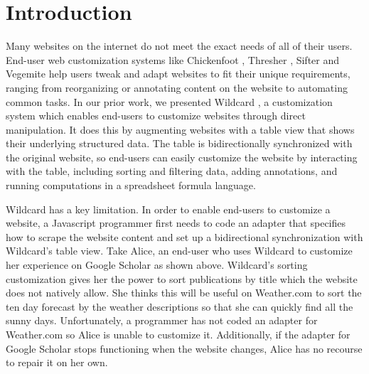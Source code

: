 \documentclass[sigconf,10pt]{acmart}
\begin{document}


\maketitle

\hypertarget{sec:introduction}{%
\section{Introduction}\label{sec:introduction}}

Many websites on the internet do not meet the exact needs of all of
their users. End-user web customization systems like Chickenfoot
\citep{bolin2005}, Thresher \citep{hogue2005}, Sifter \citep{huynh2006}
and Vegemite \citep{lin2009} help users tweak and adapt websites to fit
their unique requirements, ranging from reorganizing or annotating
content on the website to automating common tasks. In our prior work, we
presented Wildcard \citep{litt2020a}, a customization system which
enables end-users to customize websites through direct manipulation. It
does this by augmenting websites with a table view that shows their
underlying structured data. The table is bidirectionally synchronized
with the original website, so end-users can easily customize the website
by interacting with the table, including sorting and filtering data,
adding annotations, and running computations in a spreadsheet formula
language.

Wildcard has a key limitation. In order to enable end-users to customize
a website, a Javascript programmer first needs to code an adapter that
specifies how to scrape the website content and set up a bidirectional
synchronization with Wildcard's table view. Take Alice, an end-user who
uses Wildcard to customize her experience on Google Scholar as shown
above. Wildcard's sorting customization gives her the power to sort
publications by title which the website does not natively allow. She
thinks this will be useful on Weather.com to sort the ten day forecast
by the weather descriptions so that she can quickly find all the sunny
days. Unfortunately, a programmer has not coded an adapter for
Weather.com so Alice is unable to customize it. Additionally, if the
adapter for Google Scholar stops functioning when the website changes,
Alice has no recourse to repair it on her own.
\end{document}
